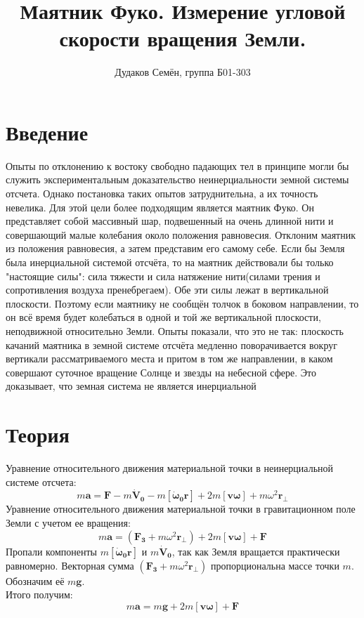 \documentclass[a4, 12pt]{article}
\title{Маятник Фуко. Измерение угловой скорости вращения Земли.}
\author{Дудаков Семён, группа Б01-303}
\date{}
\begin{document}
	\maketitle
\newpage
\section{Введение}
Опыты по отклонению к востоку свободно падающих тел в принципе могли бы служить экспериментальным доказательство неинерциальности земной системы отсчета. Однако постановка таких опытов затруднительна, а их точность невелика. Для этой цели более подходящим является маятник Фуко. Он представляет собой массивный шар, подвешенный на очень длинной нити и совершающий малые колебания около положения равновесия. Отклоним маятник из положения равновесия, а затем представим его самому себе. Если бы Земля была инерциальной системой отсчёта, то на маятник действовали бы только "настоящие силы": сила тяжести и сила натяжение нити(силами трения и сопротивления воздуха пренебрегаем). Обе эти силы лежат в вертикальной плоскости. Поэтому если маятнику не сообщён толчок в боковом направлении, то он всё время будет колебаться в одной и той же вертикальной плоскости, неподвижной относительно Земли. Опыты показали, что это не так: плоскость качаний маятника в земной системе отсчёта медленно поворачивается вокруг вертикали рассматриваемого места и притом в том же направлении, в каком совершают суточное вращение Солнце и звезды на небесной сфере. Это доказывает, что земная система не является инерциальной
\section{Теория} 
Уравнение относительного движения материальной точки в неинерциальной системе отсчета:
\begin{equation*}
    m\mathbf{a}=\mathbf{F}-m\mathbf{\dot V_0}-m[\boldsymbol{\dot \omega_0}\mathbf{r}]+2m[\mathbf{v}\boldsymbol{\omega}]+m\omega^2\mathbf{r_\perp}
\end{equation*}
Уравнение относительного движения материальной точки в гравитационном поле Земли с учетом ее вращения:
\begin{equation*}
    m\mathbf{a}=(\mathbf{F_3} + m\omega^2\mathbf{r_\perp})+2m[\mathbf{v}\boldsymbol{\omega}]+\mathbf{F}
\end{equation*}
Пропали компоненты $m[\boldsymbol{\dot \omega_0}\mathbf{r}]$ и $m\mathbf{\dot V_0}$, так как Земля вращается практически равномерно.
Векторная сумма $(\mathbf{F_3} + m\omega^2\mathbf{r_\perp})$ пропорциональна массе точки $m$. Обозначим её $m\mathbf{g}$.\\
Итого получим:
\begin{equation*}
    m\mathbf{a}=m\mathbf{g}+2m[\mathbf{v}\boldsymbol{\omega}]+\mathbf{F}
\end{equation*}
\end{document}
